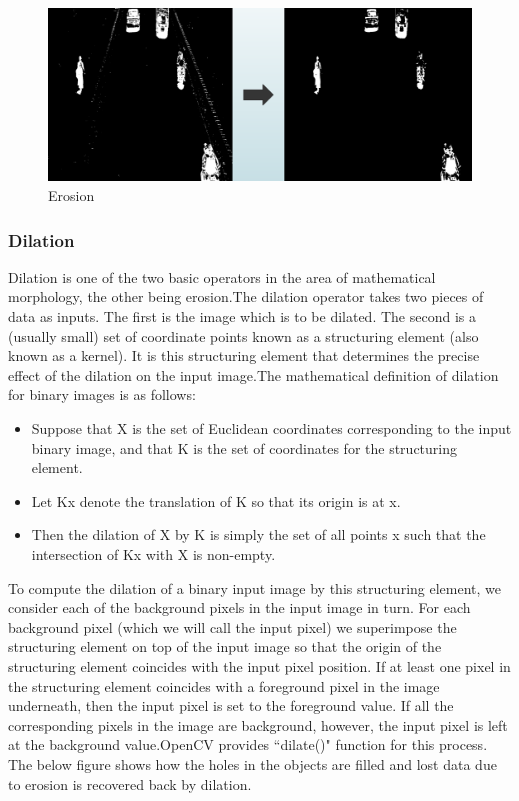 \documentclass[12pt, a4paper]{article}
\begin{document}
\begin{figure}[h!]\includegraphics[width=\linewidth]{erosion.png}\caption{Erosion}\end{figure}
\begin{large}\subsubsection{Dilation}\end{large}
\hspace{3cm}
Dilation is one of the two basic operators in the area of mathematical morphology, the other being erosion.The dilation operator takes two pieces of data as inputs. The first is the image which is to be dilated. The second is a (usually small) set of coordinate points known as a structuring element (also known as a kernel). It is this structuring element that determines the precise effect of the dilation on the input image.The mathematical definition of dilation for binary images is as follows:
\begin{itemize}
\item Suppose that X is the set of Euclidean coordinates corresponding to the input binary image, and that K is the set of coordinates for the structuring element.
\item Let Kx denote the translation of K so that its origin is at x.
\item Then the dilation of X by K is simply the set of all points x such that the intersection of Kx with X is non-empty.
\end{itemize}
To compute the dilation of a binary input image by this structuring element, we consider each of the background pixels in the input image in turn. For each background pixel (which we will call the input pixel) we superimpose the structuring element on top of the input image so that the origin of the structuring element coincides with the input pixel position. If at least one pixel in the structuring element coincides with a foreground pixel in the image underneath, then the input pixel is set to the foreground value. If all the corresponding pixels in the image are background, however, the input pixel is left at the background value.OpenCV provides ``dilate()" function for this process. The below figure shows how the holes in the objects are filled and lost data due to erosion is recovered back by dilation.
\end{document}
